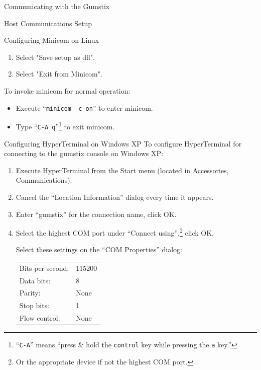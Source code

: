\documentclass{article}
\begin{document}
\begin{section}{Communicating with the Gumstix}
\begin{subsection}{Host Communications Setup}
\begin{subsubsection}{Configuring Minicom on Linux}
\begin{enumerate}
					\item Select "Save setup as dfl".
					\item Select "Exit from Minicom".
				\end{enumerate}
				To invoke minicom for normal operation:
				\begin{itemize}
					\item Execute ``\verb|minicom -c on|'' to enter minicom.
					\item Type ``\verb|C-A q|''\footnote{``\texttt{C-A}'' means ``press \& hold
					      the \texttt{control} key while pressing the \texttt{a} key.''} to exit
					      minicom.
				\end{itemize}
			\end{subsubsection}

			\begin{subsubsection}{Configuring HyperTerminal on Windows XP} \label{hyperterm_xp}
				To configure HyperTerminal for connecting to the gumstix console on Windows
				XP:
				\begin{enumerate}
					\item Execute HyperTerminal from the Start menu (located in Accessories,
					      Communications).
					\item Cancel the ``Location Information'' dialog every time it appears.
					\item Enter ``gumstix'' for the connection name, click OK.
					\item Select the highest COM port under ``Connect using'',\footnote{Or the
					      appropriate device if not the highest COM port.} click OK.

					\begin{item}
						Select these settings on the ``COM Properties'' dialog:
						\begin{center}
							\begin{tabular}{|ll|}
								\hline %
								Bits per second: & 115200 \\
								Data bits:       & 8      \\
								Parity:          & None   \\
								Stop bits:       & 1      \\
								Flow control:    & None   \\
								\hline %
							\end{tabular}
						\end{center}
					\end{item}


\end{enumerate}
\end{subsubsection}
\end{subsection}
\end{section}
\end{document}
